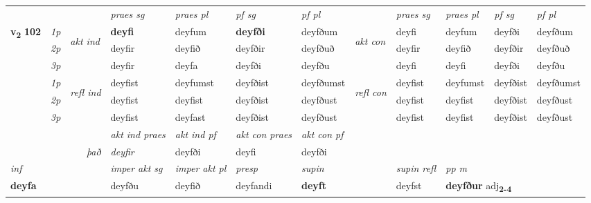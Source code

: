\begin{longtable}[l]{X>{\footnotesize\itshape}llXXXXlXXXX}
 & &   & \textit{praes sg}  & \textit{praes pl}    & \textit{ pf sg} & \textit{pf pl} & & \textit{praes sg}  & \textit{praes pl}    & \textit{pf sg} & \textit{pf pl }  \\ \cmidrule{4-7} \cmidrule{9-12}
 \multirow{2}{*}{{{\textbf{v{\textsubscript{2}}} \Large{\textbf{102}}}}}  & 1p & \multirow{3}{*}{\begin{turn}{90}\textit{akt ind}\end{turn}} & \textbf{deyfi} & deyfum & \textbf{deyfði} & deyfðum & \multirow{3}{*}{\begin{turn}{90}\textit{akt con}\end{turn}} &deyfi & deyfum & deyfði & deyfðum\\*
 & 2p &  &  deyfir  & deyfið & deyfðir & deyfðuð & & deyfir & deyfið & deyfðir & deyfðuð \\*
 & 3p &  & deyfir & deyfa & deyfði & deyfðu & & deyfi & deyfi& deyfði & deyfðu \\*
\cmidrule{4-7} \cmidrule{9-12}
 & 1p & \multirow{3}{*}{\begin{turn}{90}\textit{refl ind}\end{turn}}  & deyfist & deyfumst & deyfðist & deyfðumst & \multirow{3}{*}{\begin{turn}{90}\textit{refl con}\end{turn}}  &deyfist & deyfumst & deyfðist & deyfðumst \\*
 & 2p &  & deyfist & deyfist & deyfðist & deyfðust & &deyfist & deyfist & deyfðist & deyfðust \\*
 & 3p  & & deyfist & deyfast & deyfðist & deyfðust & & deyfist & deyfist& deyfðist & deyfðust \\*
\cmidrule{4-7} \cmidrule{9-12}

   && &  \textit{akt ind praes} & \textit{akt ind pf} & \textit{akt con praes} & \textit{akt con pf} \\*
\multicolumn{3}{r}{\textit{það}} & deyfir & deyfði & deyfi & deyfði \\*

\cmidrule{4-7}
   {\textit{inf}} & &  & \textit{imper akt sg} & \textit{imper akt pl}   & \textit{presp} & \textit{supin} && \textit{supin refl} & \textit{pp m} \\*
  {\textbf{deyfa}} & && deyfðu  & deyfið   & deyfandi &  \textbf{deyft} && deyfst & \multicolumn{2}{l}{\textbf{deyfður} adj\textbf{\textsubscript{2-4}}} \\*

\midrule


\end{longtable}
